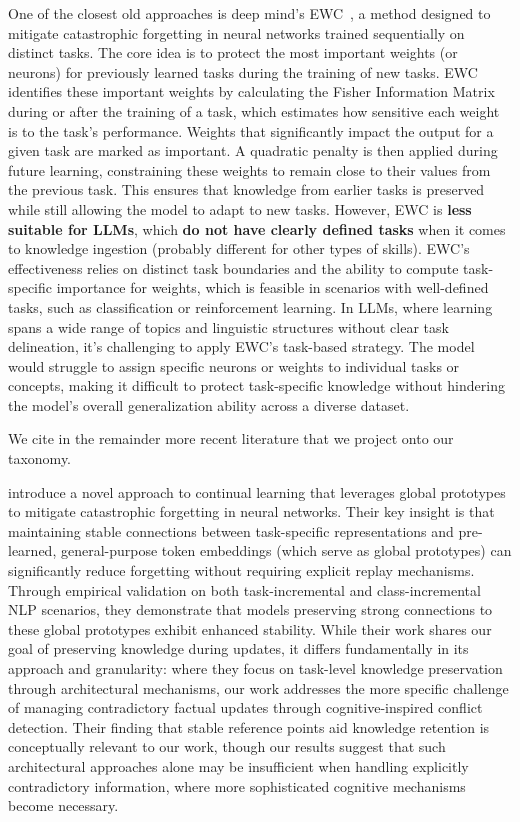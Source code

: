 One of the closest old approaches is deep mind's EWC~\citep{kirkpatrick2017overcoming}, a method designed to mitigate catastrophic forgetting in neural networks trained sequentially on distinct tasks. The core idea is to protect the most important weights (or neurons) for previously learned tasks during the training of new tasks. EWC identifies these important weights by calculating the Fisher Information Matrix during or after the training of a task, which estimates how sensitive each weight is to the task’s performance. Weights that significantly impact the output for a given task are marked as important. A quadratic penalty is then applied during future learning, constraining these weights to remain close to their values from the previous task. This ensures that knowledge from earlier tasks is preserved while still allowing the model to adapt to new tasks. However, EWC is \textbf{less suitable for LLMs}, which \textbf{do not have clearly defined tasks} when it comes to knowledge ingestion (probably different for other types of skills). EWC's effectiveness relies on distinct task boundaries and the ability to compute task-specific importance for weights, which is feasible in scenarios with well-defined tasks, such as classification or reinforcement learning. In LLMs, where learning spans a wide range of topics and linguistic structures without clear task delineation, it’s challenging to apply EWC's task-based strategy. The model would struggle to assign specific neurons or weights to individual tasks or concepts, making it difficult to protect task-specific knowledge without hindering the model’s overall generalization ability across a diverse dataset.

We cite in the remainder more recent literature that we project onto our taxonomy.

\citet{baicontinual} introduce a novel approach to continual learning that leverages global prototypes to mitigate catastrophic forgetting in neural networks. Their key insight is that maintaining stable connections between task-specific representations and pre-learned, general-purpose token embeddings (which serve as global prototypes) can significantly reduce forgetting without requiring explicit replay mechanisms. Through empirical validation on both task-incremental and class-incremental NLP scenarios, they demonstrate that models preserving strong connections to these global prototypes exhibit enhanced stability. While their work shares our goal of preserving knowledge during updates, it differs fundamentally in its approach and granularity: where they focus on task-level knowledge preservation through architectural mechanisms, our work addresses the more specific challenge of managing contradictory factual updates through cognitive-inspired conflict detection. Their finding that stable reference points aid knowledge retention is conceptually relevant to our work, though our results suggest that such architectural approaches alone may be insufficient when handling explicitly contradictory information, where more sophisticated cognitive mechanisms become necessary.

